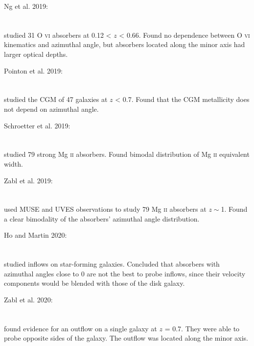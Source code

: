 \hline

Ng et al. 2019: \\
\citet{2019ApJ...886...66N} \\
\citep{2019ApJ...886...66N} \\
studied 31 O \textsc{vi} absorbers at 0.12 < $z$ < 0.66. Found no dependence
between O \textsc{vi} kinematics and azimuthal angle, but absorbers located
along the minor axis had larger optical depths. \\

\hline

Pointon et al. 2019: \\
\citet{2019ApJ...883...78P} \\
\citep{2019ApJ...883...78P} \\
studied the CGM of 47 galaxies at $z$ < 0.7. Found that the CGM metallicity does
not depend on azimuthal angle. \\

\hline

Schroetter et al. 2019: \\
\citet{2019MNRAS.490.4368S} \\
\citep{2019MNRAS.490.4368S} \\
studied 79 strong Mg \textsc{ii} absorbers. Found bimodal distribution of
Mg \textsc{ii} equivalent width. \\

\hline

Zabl et al. 2019: \\
\citet{2019MNRAS.485.1961Z} \\
\citep{2019MNRAS.485.1961Z} \\
used MUSE and UVES observations to study 79 Mg \textsc{ii} absorbers at
$z\sim$1. Found a clear bimodality of the absorbers' azimuthal angle
distribution. \\

\hline

Ho and Martin 2020: \\
\citet{2020ApJ...888...14H} \\
\citep{2020ApJ...888...14H} \\
studied inflows on star-forming galaxies. Concluded that absorbers with
azimuthal angles close to 0 are not the best to probe inflows, since their
velocity components would be blended with those of the disk galaxy. \\

\hline

Zabl et al. 2020: \\
\citet{2020MNRAS.492.4576Z} \\
\citep{2020MNRAS.492.4576Z} \\
found evidence for an outflow on a single galaxy at $z$ = 0.7. They were able to
probe opposite sides of the galaxy. The outflow was located along the minor
axis. \\

